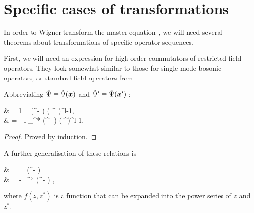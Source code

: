 \section{Specific cases of transformations}

In order to Wigner transform the master equation~, we will need several theorems about transformations of specific operator sequences.

First, we will need an expression for high-order commutators of restricted field operators.
They look somewhat similar to those for single-mode bosonic operators, or standard field operators from~\cite{Louisell1990}.

\begin{lemma}
	Abbreviating $\hat{\Psi} \equiv \hat{\Psi}(\boldsymbol{x})$ and $\hat{\Psi}^\prime \equiv \hat{\Psi}(\boldsymbol{x}^\prime)$ :
	\begin{eqn*}
		& = l \delta_{\restbasis} (\xvec^\prime - \xvec) ( \Psiop^{\prime\dagger} )^{l-1}, \\
		& = - l \delta_{\restbasis}^* (\xvec^\prime - \xvec) ( \Psiop^\prime )^{l-1}.
	\end{eqn*}
\end{lemma}
\begin{proof}
Proved by induction.
\end{proof}

A further generalisation of these relations is

\begin{lemma}
\label{lmm:func-operators:functional-commutators}
	\begin{eqn*}
		& = \delta_{\restbasis} (\xvec^\prime - \xvec) \frac{\partial f}{\partial \Psiop^{\prime\dagger}} \\
		& = -\delta_{\restbasis}^* (\xvec^\prime - \xvec) \frac{\partial f}{\partial \Psiop^\prime},
	\end{eqn*}
	where $f(z, z^*)$ is a function that can be expanded into the power series of $z$ and $z^*$.
\end{lemma}

